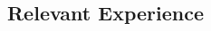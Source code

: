 \documentclass[12pt]{article}
\begin{document}
\begin{multicols}{2}
  \section*{Relevant Experience}
  \columnbreak

  \begin{Large}
    \begin{flushright}
    \end{flushright}
  \end{Large}

\end{multicols}
  
\end{document}
